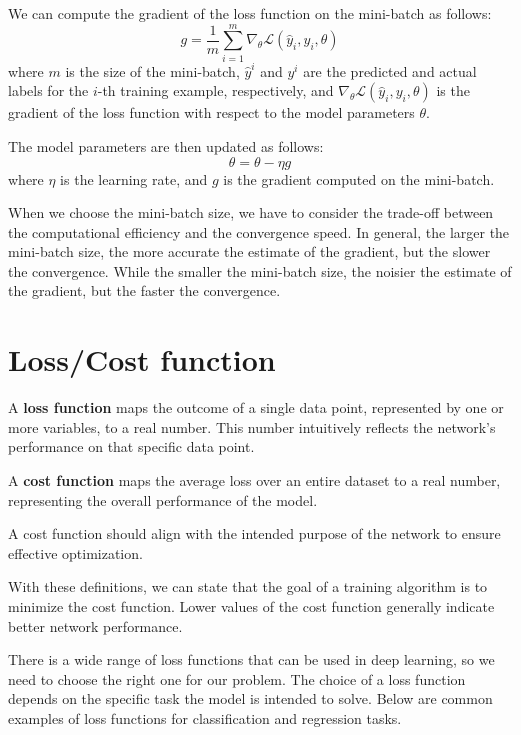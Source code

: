 We can compute the gradient of the loss function on the mini-batch as follows:
\begin{equation}
    g = \frac{1}{m} \sum_{i = 1}^{m} \nabla_{\theta} \mathcal{L}(\hat{y}_i, y_i, \theta)
\end{equation}
where $m$ is the size of the mini-batch, $\hat{y}^i$ and $y^i$ are the predicted
and actual labels for the $i$-th training example, respectively, and $\nabla_{\theta}
    \mathcal{L}(\hat{y}_i, y_i, \theta)$ is the gradient of the loss function with
respect to the model parameters $\theta$.

The model parameters are then updated as follows:
\begin{equation}
    \theta = \theta - \eta g
\end{equation}
where $\eta$ is the learning rate, and $g$ is the gradient computed on the mini-batch.

When we choose the mini-batch size, we have to consider the trade-off between
the computational efficiency and the convergence speed. In general, the larger
the mini-batch size, the more accurate the estimate of the gradient, but the
slower the convergence. While the smaller the mini-batch size, the noisier the
estimate of the gradient, but the faster the convergence.
\section{Loss/Cost function}
\begin{definition}
    A \textbf{loss function} maps the outcome of a single data point, represented
    by one or more variables, to a real number. This number intuitively reflects
    the network's performance on that specific data point.
\end{definition}
\begin{definition}
    A \textbf{cost function} maps the average loss over an entire dataset to a
    real number, representing the overall performance of the model.

    A cost function should align with the intended purpose of the network to
    ensure effective optimization.
\end{definition}
With these definitions, we can state that the goal of a training algorithm is to
minimize the cost function. Lower values of the cost function generally indicate
better network performance.

There is a wide range of loss functions that can be used in deep learning, so we
need to choose the right one for our problem. The choice of a loss function depends
on the specific task the model is intended to solve. Below are common examples of
loss functions for classification and regression tasks.
